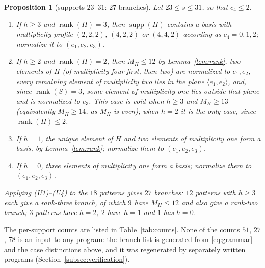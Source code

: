 \documentclass[11pt]{article}
\newtheorem{proposition}[theorem]{Proposition}
\theoremstyle{definition}
\theoremstyle{remark}
\newcommand{\supp}{\operatorname{supp}}
\newcommand{\rank}{\operatorname{rank}}
\begin{document}
\begin{proposition}[supports $23$--$31$: $27$ branches]\label{prop:upper}
Let $23\le s\le31$, so that $c_4\le2$.
\begin{enumerate}[label=\textup{(U\arabic*)},leftmargin=3em]
\item If $h\ge3$ and $\rank(H)=3$, then $\supp(H)$ contains a basis with multiplicity profile $(2,2,2)$, $(4,2,2)$ or $(4,4,2)$ according as $c_4=0,1,2$; normalize it to $(e_1,e_2,e_3)$.
\item If $h\ge2$ and $\rank(H)=2$, then $M_H\le12$ by Lemma~\ref{lem:rank}, two elements of $H$ (of multiplicity four first, then two) are normalized to $e_1,e_2$, every remaining element of multiplicity two lies in the plane $\langle e_1,e_2\rangle$, and, since $\rank(S)=3$, some element of multiplicity one lies outside that plane and is normalized to $e_3$. This case is void when $h\ge3$ and $M_H\ge13$ (equivalently $M_H\ge14$, as $M_H$ is even); when $h=2$ it is the only case, since $\rank(H)\le2$.
\item If $h=1$, the unique element of $H$ and two elements of multiplicity one form a basis, by Lemma~\ref{lem:rank}; normalize them to $(e_1,e_2,e_3)$.
\item If $h=0$, three elements of multiplicity one form a basis; normalize them to $(e_1,e_2,e_3)$.
\end{enumerate}
Applying (U1)--(U4) to the $18$ patterns gives $27$ branches: $12$ patterns with $h\ge3$ each give a rank-three branch, of which $9$ have $M_H\le12$ and also give a rank-two branch; $3$ patterns have $h=2$, $2$ have $h=1$ and $1$ has $h=0$.
\end{proposition}

The per-support counts are listed in Table~\ref{tab:counts}. None of the counts $51$, $27$, $78$ is an input to any program: the branch list is generated from \eqref{eq:grammar} and the case distinctions above, and it was regenerated by separately written programs (Section~\ref{subsec:verification}).
\end{document}
